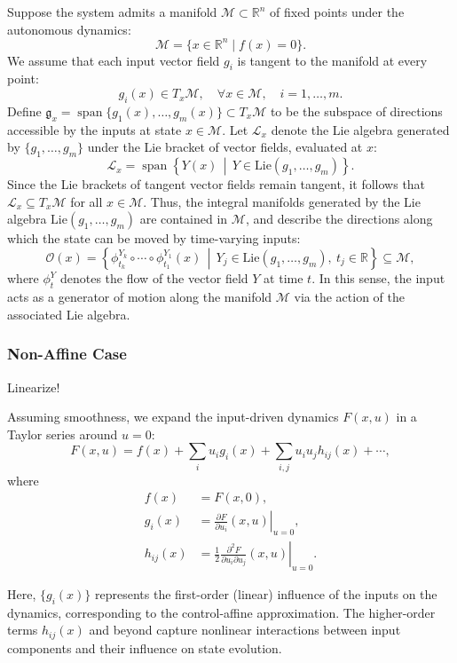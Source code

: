 \documentclass{article}
\theoremstyle{definition} \newtheorem{definition}{Definition}  \newtheorem{example}{Example}
\theoremstyle{remark} \newtheorem{remark}{Remark}
\newcounter{ct}
\begin{document}
Suppose the system admits a manifold \( \mathcal{M} \subset \mathbb{R}^n \) of fixed points under the autonomous dynamics:
\[
\mathcal{M} = \{ x \in \mathbb{R}^n \mid f(x) = 0 \}.
\]
We assume that each input vector field \( g_i \) is tangent to the manifold at every point:
\[
g_i(x) \in T_x \mathcal{M}, \quad \forall x \in \mathcal{M}, \quad i = 1, \dots, m.
\]
Define \( \mathfrak{g}_x = \operatorname{span} \{ g_1(x), \dots, g_m(x) \} \subset T_x \mathcal{M} \) to be the subspace of directions accessible by the inputs at state \( x \in \mathcal{M} \). Let \( \mathcal{L}_x \) denote the Lie algebra generated by \( \{g_1, \dots, g_m\} \) under the Lie bracket of vector fields, evaluated at \( x \):
\[
\mathcal{L}_x = \operatorname{span} \left\{ Y(x) \,\middle|\, Y \in \mathrm{Lie}(g_1, \dots, g_m) \right\}.
\]
Since the Lie brackets of tangent vector fields remain tangent, it follows that \( \mathcal{L}_x \subseteq T_x \mathcal{M} \) for all \( x \in \mathcal{M} \).
Thus, the integral manifolds generated by the Lie algebra \( \mathrm{Lie}(g_1, \dots, g_m) \) are contained in \( \mathcal{M} \), and describe the directions along which the state can be moved by time-varying inputs:
\[
\mathcal{O}(x) = \left\{ \phi_{t_k}^{Y_k} \circ \cdots \circ \phi_{t_1}^{Y_1}(x) \,\middle|\, Y_j \in \mathrm{Lie}(g_1, \dots, g_m),\ t_j \in \mathbb{R} \right\} \subseteq \mathcal{M},
\]
where \( \phi_t^Y \) denotes the flow of the vector field \( Y \) at time \( t \). In this sense, the input acts as a generator of motion along the manifold \( \mathcal{M} \) via the action of the associated Lie algebra.


\subsubsection{Non-Affine Case}\label{sec:controlaffine}
Linearize!

Assuming smoothness, we expand the input-driven dynamics \( F(x, u) \) in a Taylor series around \( u = 0 \):
\[
F(x, u) = f(x) + \sum_{i} u_i g_i(x) + \sum_{i,j} u_i u_j h_{ij}(x) + \cdots,
\]
where
\begin{align}
f(x) &= F(x, 0),\\
g_i(x) &= \left. \frac{\partial F}{\partial u_i}(x, u) \right|_{u = 0},\\
h_{ij}(x) &= \left. \frac{1}{2} \frac{\partial^2 F}{\partial u_i \partial u_j}(x, u) \right|_{u = 0}.
\end{align}

Here, \( \{g_i(x)\} \) represents the first-order (linear) influence of the inputs on the dynamics, corresponding to the control-affine approximation. The higher-order terms \( h_{ij}(x) \) and beyond capture nonlinear interactions between input components and their influence on state evolution.
\end{document}
